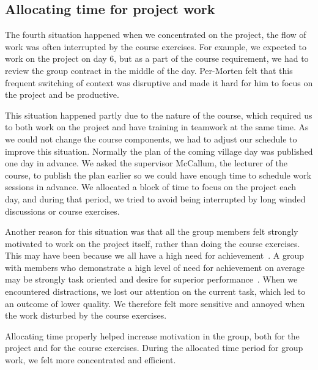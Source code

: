 \subsection{Allocating time for project work}
The fourth situation happened when we concentrated on the project, the flow of work was often interrupted by the course exercises. For example, we expected to work on the project on day 6, but as a part of the course requirement, we had to review the group contract in the middle of the day. Per-Morten felt that this frequent switching of context was disruptive and made it hard for him to focus on the project and be productive.

This situation happened partly due to the nature of the course, which required us to both work on the project and have training in teamwork at the same time. As we could not change the course components, we had to adjust our schedule to improve this situation. Normally the plan of the coming village day was published one day in advance. We asked the supervisor McCallum, the lecturer of the course, to publish the plan earlier so we could have enough time to schedule work sessions in advance. We allocated a block of time to focus on the project each day, and during that period, we tried to avoid being interrupted by long winded discussions or course exercises.
 
Another reason for this situation was that all the group members felt strongly motivated to work on the project itself, rather than doing the course exercises. This may have been because we all have a high need for achievement~\cite{2014chin_and_choi}. A group with members who demonstrate a high level of need for achievement on average may be strongly task oriented and desire for superior performance~\cite{2014chin_and_choi}. When we encountered distractions, we lost our attention on the current task, which led to an outcome of lower quality. We therefore felt more sensitive and annoyed when the work disturbed by the course exercises. 

Allocating time properly helped increase motivation in the group, both for the project and for the course exercises. During the allocated time period for group work, we felt more concentrated and efficient.
